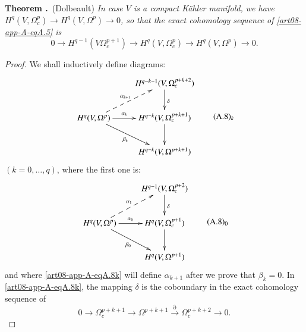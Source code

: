 \medskip
\noindent
{\bf Theorem .\label{art08-app-A-thmA.6}}~(Dolbeault)
{\em In case $V$ is a compact K\"ahler manifold, we have $H^{q}(V,\Omega^{p}_{c})\to H^{q}(V,\Omega^{p})\to 0$, so that the exact cohomology sequence of \eqref{art08-app-A-eqA.5} is}
\begin{equation*}
0\to H^{q-1}(V\Omega^{p+1}_{c})\to H^{q}(V,\Omega^{p}_{c})\to H^{q}(V,\Omega^{p})\to 0.\tag{A.7}\label{art08-app-A-eqA.7}
\end{equation*}

\begin{proof}
We shall inductively define diagrams:
\begin{equation*}
\vcenter{\xymatrix{
 & H^{q-k-1}(V,\Omega^{p+k+2}_{c})\ar[d]^{\delta}\\
H^{q}(V,\Omega^{p})\ar[r]^-{\alpha_{k}}\ar@{-->}[ur]^-{\alpha_{k+1}}\ar[dr]_-{\beta_{k}} & H^{q-k}(V,\Omega^{p+k+1}_{c})\ar[d]\\
 & H^{q-k}(V,\Omega^{p+k+1})
}}\tag*{(A.8)$_{k}$}\label{art08-app-A-eqA.8k}
\end{equation*}
$(k=0,\ldots,q)$, where the first one is:
\begin{equation*}
\vcenter{\xymatrix{
 & H^{q-1}(V,\Omega^{p+2}_{c})\ar[d]^{\delta}\\
H^{q}(V,\Omega^{p})\ar[r]^-{\alpha_{0}}\ar@{-->}[ur]^-{\alpha_{1}}\ar[dr]_-{\beta_{0}} & H^{q}(V,\Omega^{p+1}_{c})\ar[d]\\
 & H^{q}(V,\Omega^{p+1})
}}\tag*{(A.8)$_{0}$}\label{art08-app-A-eqA.8-0}
\end{equation*}\pageoriginale
and where \ref{art08-app-A-eqA.8k} will define $\alpha_{k+1}$ after we prove that $\beta_{k}=0$. In \ref{art08-app-A-eqA.8k}, the mapping $\delta$ is the coboundary in the exact cohomology sequence of
$$
0\to \Omega^{p+k+1}_{c}\to \Omega^{p+k+1}\xrightarrow{\partial}\Omega_{c}^{p+k+2}\to 0.
$$

\eject


\end{proof}
